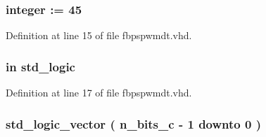 \subsubsection[{c\+\_\+\+Dead\+\_\+t}]{ {\bfseries \textcolor{vhdlchar}{ }} {\bfseries \textcolor{comment}{integer}\textcolor{vhdlchar}{ }\textcolor{vhdlchar}{ }\textcolor{vhdlchar}{\+:}\textcolor{vhdlchar}{=}\textcolor{vhdlchar}{ }\textcolor{vhdlchar}{ } \textcolor{vhdldigit}{45} \textcolor{vhdlchar}{ }} \hspace{0.3cm}{\ttfamily [Generic]}}\label{classfbpspwmdt_a66678837c93def3337995d7ffcb44f3f}


Definition at line 15 of file fbpspwmdt.\+vhd.

\hypertarget{classfbpspwmdt_a4a4609c199d30b3adebbeb3a01276ec5}{}
\subsubsection[{clk}]{ {\bfseries \textcolor{keywordflow}{in}\textcolor{vhdlchar}{ }} {\bfseries \textcolor{comment}{std\+\_\+logic}\textcolor{vhdlchar}{ }} \hspace{0.3cm}{\ttfamily [Port]}}\label{classfbpspwmdt_a4a4609c199d30b3adebbeb3a01276ec5}


Definition at line 17 of file fbpspwmdt.\+vhd.

\hypertarget{classfbpspwmdt_a021a597db1ce780174de5711902bf8f5}{}
\subsubsection[{comp}]{ {\bfseries \textcolor{vhdlchar}{ }} {\bfseries \textcolor{comment}{std\+\_\+logic\+\_\+vector}\textcolor{vhdlchar}{ }\textcolor{vhdlchar}{(}\textcolor{vhdlchar}{ }\textcolor{vhdlchar}{ }\textcolor{vhdlchar}{ }\textcolor{vhdlchar}{ }{\bfseries {\bf n\+\_\+bits\+\_\+c}} \textcolor{vhdlchar}{-\/}\textcolor{vhdlchar}{ } \textcolor{vhdldigit}{1} \textcolor{vhdlchar}{ }\textcolor{keywordflow}{downto}\textcolor{vhdlchar}{ }\textcolor{vhdlchar}{ } \textcolor{vhdldigit}{0} \textcolor{vhdlchar}{ }\textcolor{vhdlchar}{)}\textcolor{vhdlchar}{ }} \hspace{0.3cm}{\ttfamily [Port]}}\label{classfbpspwmdt_a021a597db1ce780174de5711902bf8f5}


